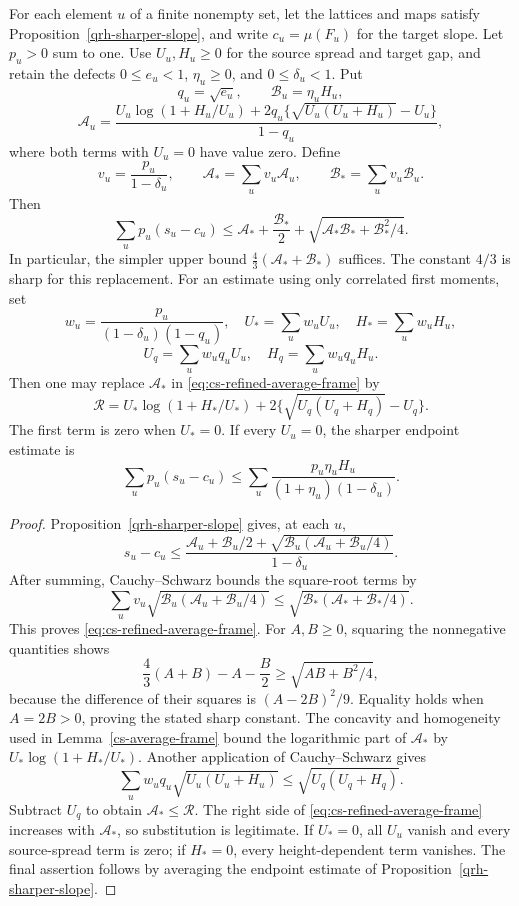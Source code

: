 \begin{proposition}
\label{cs-refined-average-frame}
For each element $u$ of a finite nonempty set, let the lattices and
maps satisfy Proposition~\ref{qrh-sharper-slope}, and write
$c_u=\mu(F_u)$ for the target slope. Let $p_u>0$ sum to one.
Use $U_u,H_u\ge0$ for the source spread and target gap, and retain
the defects $0\le e_u<1$, $\eta_u\ge0$, and $0\le\delta_u<1$.
Put
\[
 q_u=\sqrt{e_u},\qquad \mathcal B_u=\eta_uH_u,
\]
\[
 \mathcal A_u=
 \frac{U_u\log(1+H_u/U_u)
       +2q_u\{\sqrt{U_u(U_u+H_u)}-U_u\}}{1-q_u},
\]
where both terms with $U_u=0$ have value zero. Define
\[
 v_u=\frac{p_u}{1-\delta_u},\qquad
 \mathcal A_*=\sum_uv_u\mathcal A_u,\qquad
 \mathcal B_*=\sum_uv_u\mathcal B_u.
\]
Then
\begin{equation}\label{eq:cs-refined-average-frame}
 \sum_up_u(s_u-c_u)\le
 \mathcal A_*+\frac{\mathcal B_*}{2}
       +\sqrt{\mathcal A_*\mathcal B_*+\mathcal B_*^2/4}.
\end{equation}
In particular, the simpler upper bound
$\tfrac43(\mathcal A_*+\mathcal B_*)$ suffices. The constant
$4/3$ is sharp for this replacement.
For an estimate using only correlated first moments, set
\[
 w_u=\frac{p_u}{(1-\delta_u)(1-q_u)},\quad
 U_*=\sum_uw_uU_u,\quad H_*=\sum_uw_uH_u,
\]
\[
 U_q=\sum_uw_uq_uU_u,\quad H_q=\sum_uw_uq_uH_u.
\]
Then one may replace $\mathcal A_*$ in
\eqref{eq:cs-refined-average-frame} by
\begin{equation}\label{eq:cs-refined-correlated-moments}
 \mathcal R=
 U_*\log(1+H_*/U_*)+
       2\{\sqrt{U_q(U_q+H_q)}-U_q\}.
\end{equation}
The first term is zero when $U_*=0$. If every $U_u=0$, the sharper
endpoint estimate is
\[
 \sum_up_u(s_u-c_u)\le
       \sum_u\frac{p_u\eta_uH_u}{(1+\eta_u)(1-\delta_u)}.
\]
\end{proposition}
\begin{proof}
Proposition~\ref{qrh-sharper-slope} gives, at each $u$,
\[
 s_u-c_u\le
 \frac{\mathcal A_u+\mathcal B_u/2+
             \sqrt{\mathcal B_u(\mathcal A_u+\mathcal B_u/4)}}
      {1-\delta_u}.
\]
After summing, Cauchy--Schwarz bounds the square-root terms by
\[
 \sum_uv_u\sqrt{\mathcal B_u(\mathcal A_u+\mathcal B_u/4)}
 \le\sqrt{\mathcal B_*(\mathcal A_*+\mathcal B_*/4)}.
\]
This proves \eqref{eq:cs-refined-average-frame}.
For $A,B\ge0$, squaring the nonnegative quantities shows
\[
 \frac43(A+B)-A-\frac B2\ge\sqrt{AB+B^2/4},
\]
because the difference of their squares is $(A-2B)^2/9$.
Equality holds when $A=2B>0$, proving the stated sharp constant.
The concavity and homogeneity used in Lemma~\ref{cs-average-frame}
bound the logarithmic part of $\mathcal A_*$ by
$U_*\log(1+H_*/U_*)$. Another application of Cauchy--Schwarz gives
\[
 \sum_uw_uq_u\sqrt{U_u(U_u+H_u)}
       \le\sqrt{U_q(U_q+H_q)}.
\]
Subtract $U_q$ to obtain $\mathcal A_*\le\mathcal R$.
The right side of \eqref{eq:cs-refined-average-frame} increases with
$\mathcal A_*$, so substitution is legitimate.
If $U_*=0$, all $U_u$ vanish and every source-spread term is zero;
if $H_*=0$, every height-dependent term vanishes.
The final assertion follows by averaging the endpoint estimate of
Proposition~\ref{qrh-sharper-slope}.
\end{proof}

